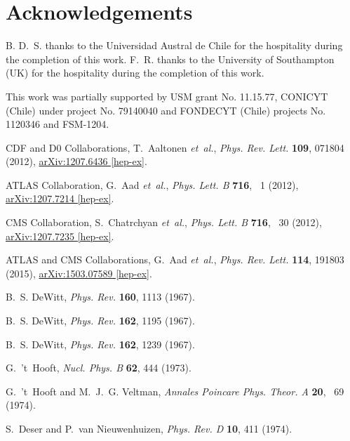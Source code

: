 \documentclass{ws-mpla}
\renewcommand{\(}{\left(}
\renewcommand{\)}{\right)}
\renewcommand{\[}{\left[}
\renewcommand{\]}{\right]}
\begin{document}
\section*{Acknowledgements}

B. D.~S. thanks to the Universidad Austral de Chile for the hospitality during the completion of this work. F.~R. thanks to the University of Southampton (UK) for the hospitality during the completion of this work.

This work was partially supported by USM grant No. 11.15.77, CONICYT (Chile) under project No. 79140040 and FONDECYT (Chile) projects No. 1120346 and FSM-1204.


\begin{thebibliography}{10}

CDF and D0 Collaborations, T.~Aaltonen {\em et~al.}, {\em Phys. Rev. Lett.}
  {\bf 109},   071804  (2012), \href{http://arxiv.org/abs/1207.6436}{{\ttfamily
  arXiv:1207.6436 [hep-ex]}}.

ATLAS Collaboration, G.~Aad {\em et~al.}, {\em Phys. Lett. B} {\bf 716},  ~1
  (2012), \href{http://arxiv.org/abs/1207.7214}{{\ttfamily arXiv:1207.7214
  [hep-ex]}}.

CMS Collaboration, S.~Chatrchyan {\em et~al.}, {\em Phys. Lett. B} {\bf 716},
  ~30  (2012), \href{http://arxiv.org/abs/1207.7235}{{\ttfamily arXiv:1207.7235
  [hep-ex]}}.

ATLAS and CMS Collaborations, G.~Aad {\em et~al.}, {\em Phys. Rev. Lett.} {\bf
  114},   191803  (2015), \href{http://arxiv.org/abs/1503.07589}{{\ttfamily
  arXiv:1503.07589 [hep-ex]}}.

B.~S. DeWitt, {\em Phys. Rev.} {\bf 160},   1113  (1967).

B.~S. DeWitt, {\em Phys. Rev.} {\bf 162},   1195  (1967).

B.~S. DeWitt, {\em Phys. Rev.} {\bf 162},   1239  (1967).

G.~'t~Hooft, {\em Nucl. Phys. B} {\bf 62},   444  (1973).

G.~'t~Hooft and M.~J.~G. Veltman, {\em Annales Poincare Phys. Theor. A} {\bf
  20},  ~69  (1974).

S.~Deser and P.~van Nieuwenhuizen, {\em Phys. Rev. D} {\bf 10},   411  (1974).


\end{thebibliography}
\end{document}
